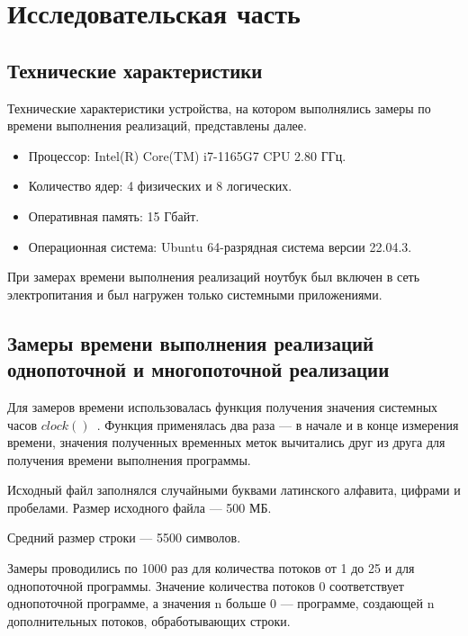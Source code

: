 \chapter{Исследовательская часть}

\section{Технические характеристики}

Технические характеристики устройства, на котором выполнялись замеры по времени выполнения реализаций, представлены далее.

\begin{itemize}
	\item Процессор: Intel(R) Core(TM) i7-1165G7 CPU 2.80 ГГц.
	\item Количество ядер: 4 физических и 8 логических.
	\item Оперативная память: 15 Гбайт.
	\item Операционная система: Ubuntu 64-разрядная система версии 22.04.3.
\end{itemize}

При замерах времени выполнения реализаций ноутбук был включен в сеть электропитания и был нагружен только системными приложениями.

\clearpage

\section{Замеры времени выполнения реализаций однопоточной и многопоточной реализации}
Для замеров времени использовалась функция получения значения системных часов $clock()$~\cite{c-lang-time}.
Функция применялась два раза --- в начале и в конце измерения времени, значения полученных временных меток вычитались друг из друга для получения времени выполнения программы.

Исходный файл заполнялся случайными буквами латинского алфавита, цифрами и пробелами.
Размер исходного файла --- 500 МБ.

Средний размер строки --- 5500 символов.

Замеры проводились по 1000 раз для количества потоков от 1 до 25 и для однопоточной программы. Значение количества потоков 0 соответствует однопоточной программе, а значения n больше 0 — программе, создающей n дополнительных потоков, обработывающих строки.

